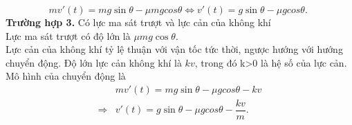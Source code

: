 \begin{equation}
	mv'(t)=mg\sin \theta -\mu mgcos\theta \Leftrightarrow v'(t)=g\sin \theta -\mu gcos\theta .\,\,
\label{eq:2.21}
\end{equation}
\textbf{Trường hợp 3.}  Có lực ma sát trượt và lực cản của không khí\\
Lực ma sát trượt có độ lớn là $\mu mg\cos \theta $.\\
Lực cản của không khí tỷ lệ thuận với vận tốc tức thời, ngược hướng với hướng chuyển động. Độ lớn lực cản không khí là $kv$, trong đó k>0 là hệ số của lực cản. Mô hình của chuyển động là                                    
\begin{equation}
	\begin{array}{ll}
	&m{v}'(t)=mg\sin \theta -\mu gcos\theta -kv \\ 
	\Rightarrow &{v}'(t)=g\sin \theta -\mu gcos\theta -\dfrac{kv}{m}.
\end{array}
\label{eq:2.22}
\end{equation}
